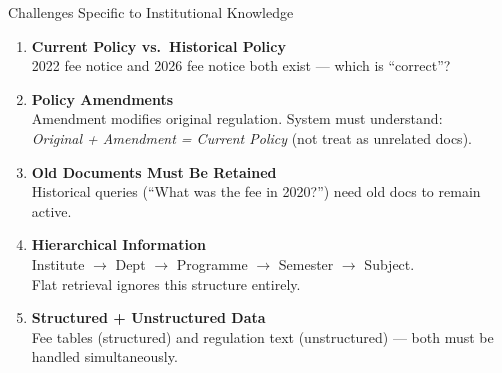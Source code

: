 \documentclass[11pt]{beamer}
\begin{document}
\begin{frame}{Challenges Specific to Institutional Knowledge}
    \begin{enumerate}
        \item \textbf{Current Policy vs.\ Historical Policy}\\
        \small 2022 fee notice and 2026 fee notice both exist --- which is ``correct''?
        \vspace{4pt}
        \item \textbf{Policy Amendments}\\
        \small Amendment modifies original regulation. System must understand:\\
        \textit{Original + Amendment = Current Policy} (not treat as unrelated docs).
        \vspace{4pt}
        \item \textbf{Old Documents Must Be Retained}\\
        \small Historical queries (``What was the fee in 2020?'') need old docs to remain active.
        \vspace{4pt}
        \item \textbf{Hierarchical Information}\\
        \small Institute $\rightarrow$ Dept $\rightarrow$ Programme $\rightarrow$ Semester $\rightarrow$ Subject.\\Flat retrieval ignores this structure entirely.
        \vspace{4pt}
        \item \textbf{Structured + Unstructured Data}\\
        \small Fee tables (structured) and regulation text (unstructured) --- both must be handled simultaneously.
    \end{enumerate}
\end{frame}
\end{document}
